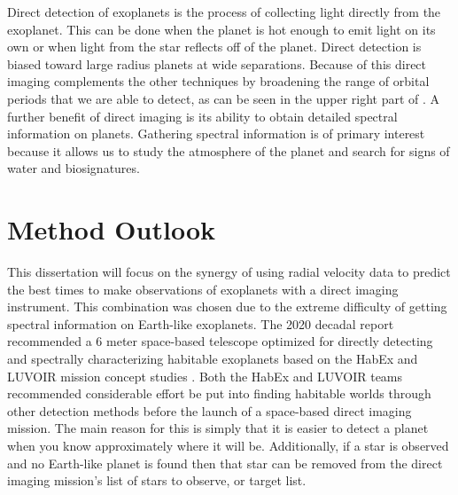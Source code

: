 Direct detection of exoplanets is the process of collecting light directly from
the exoplanet. This can be done when the planet is hot enough to emit light on
its own or when light from the star reflects off of the planet. Direct
detection is biased toward large radius planets at wide separations. Because of
this direct imaging complements the other techniques by broadening the range of
orbital periods that we are able to detect, as can be seen in the upper right
part of . A further benefit of direct
imaging is its ability to obtain detailed spectral information on planets.
Gathering spectral information is of primary interest because it allows us to
study the atmosphere of the planet and search for signs of water and
biosignatures.

\section{Method Outlook}
\label{sec:EPRV_HWO}

This dissertation will focus on the synergy of using radial velocity data to
predict the best times to make observations of exoplanets with a direct imaging
instrument. This combination was chosen due to the extreme difficulty of
getting spectral information on Earth-like exoplanets. The 2020 decadal report
recommended a 6 meter space-based telescope optimized for directly detecting
and spectrally characterizing habitable exoplanets
\citep{nationalacademiesofsciencesPathwaysDiscoveryAstronomy2021} based on the
HabEx and LUVOIR mission concept studies
\citep{gaudiHabitableExoplanetObservatory2020,TheLUVOIRTeam2019}. Both the
HabEx and LUVOIR teams recommended considerable effort be put into finding
habitable worlds through other detection methods before the launch of a
space-based direct imaging mission. The main reason for this is simply that it
is easier to detect a planet when you know approximately where it will be.
Additionally, if a star is observed and no Earth-like planet is found then that
star can be removed from the direct imaging mission's list of stars to observe,
or target list. 

